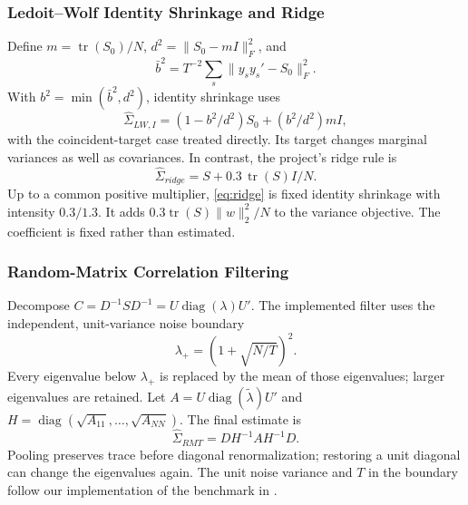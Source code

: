 \documentclass[letterpaper,journal]{IEEEtran}
\begin{document}
\subsubsection{Ledoit--Wolf Identity Shrinkage and Ridge}
Define $m=\operatorname{tr}(S_0)/N$, $d^2=\|S_0-mI\|_F^2$, and
\begin{equation}
 \bar b^2=T^{-2}\sum_s\|y_sy_s'-S_0\|_F^2.
\end{equation}
With $b^2=\min(\bar b^2,d^2)$, identity shrinkage \cite{identity} uses
\begin{equation}
 \widehat\Sigma_{LW,I}=(1-b^2/d^2)S_0+(b^2/d^2)mI,
\end{equation}
with the coincident-target case treated directly. Its target changes marginal variances as well as covariances. In contrast, the project's ridge rule is
\begin{equation}\label{eq:ridge}
 \widehat\Sigma_{ridge}=S+0.3\,\operatorname{tr}(S)I/N.
\end{equation}
Up to a common positive multiplier, \eqref{eq:ridge} is fixed identity shrinkage with intensity $0.3/1.3$. It adds $0.3\operatorname{tr}(S)\|w\|_2^2/N$ to the variance objective. The coefficient is fixed rather than estimated.

\subsubsection{Random-Matrix Correlation Filtering}
Decompose $C=D^{-1}SD^{-1}=U\operatorname{diag}(\lambda)U'$. The implemented filter uses the independent, unit-variance noise boundary
\begin{equation}
 \lambda_+=(1+\sqrt{N/T})^2.
\end{equation}
Every eigenvalue below $\lambda_+$ is replaced by the mean of those eigenvalues; larger eigenvalues are retained. Let $A=U\operatorname{diag}(\widetilde\lambda)U'$ and $H=\operatorname{diag}(\sqrt{A_{11}},\ldots,\sqrt{A_{NN}})$. The final estimate is
\begin{equation}
 \widehat\Sigma_{RMT}=DH^{-1}AH^{-1}D.
\end{equation}
Pooling preserves trace before diagonal renormalization; restoring a unit diagonal can change the eigenvalues again. The unit noise variance and $T$ in the boundary follow our implementation of the benchmark in \cite{rmt,rmtclean}.
\end{document}
